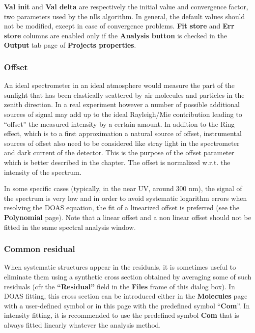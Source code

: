 \textbf{Val init} and \textbf{Val delta} are respectively the initial value and convergence factor, two parameters used by the \gls{nlls} algorithm. In general, the default values should not be modified, except in case of convergence problems. \textbf{Fit store} and \textbf{Err store} columns are enabled only if the \textbf{Analysis button} is checked in the \textbf{Output} tab page of \textbf{Projects properties}.

\subsubsection{Offset}
An ideal spectrometer in an ideal atmosphere would measure the part of the sunlight that has been elastically scattered by air molecules and particles in the zenith direction. In a real experiment however a number of possible additional sources of signal may add up to the ideal Rayleigh/Mie contribution leading to ``offset'' the measured intensity by a certain amount. In addition to the Ring effect, which is to a first approximation a natural source of offset, instrumental sources of offset also need to be considered like stray light in the spectrometer and dark current of the detector. This is the purpose of the offset parameter which is better described in the \textbf{} chapter. The offset is normalized w.r.t. the intensity of the spectrum.

In some specific cases (typically, in the near UV, around 300 nm), the signal of the spectrum is very low and in order to avoid systematic logarithm errors when resolving the DOAS equation, the fit of a linearized offset is preferred (see the \textbf{Polynomial} page). Note that a linear offset and a non linear offset should not be fitted in the same spectral analysis window.

\subsubsection{Common residual}
When systematic structures appear in the residuals, it is sometimes useful to eliminate them using a synthetic cross section obtained by averaging some of such residuals (cfr the \textbf{``Residual''} field in the \textbf{Files} frame of this dialog box). In DOAS fitting, this cross section can be introduced either in the \textbf{Molecules} page with a user-defined symbol or in this page with the predefined symbol ``\textbf{Com}''. In intensity fitting, it is recommended to use the predefined symbol \textbf{Com} that is always fitted linearly whatever the analysis method.

